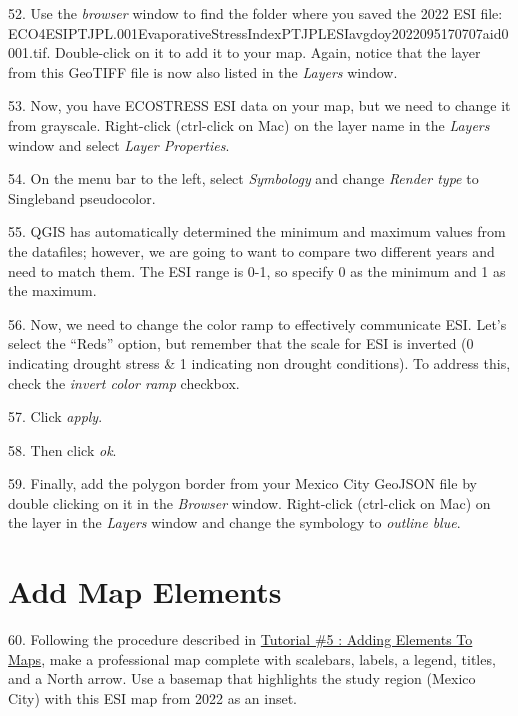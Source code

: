 \documentclass[oneside,a4paper,11pt,explicit]{book}
\begin{document}
52. Use the \textit{browser} window to find the folder where you saved the 2022 ESI file: \\ ECO4ESIPTJPL.001\textunderscore Evaporative\textunderscore Stress\textunderscore Index\textunderscore PT\textunderscore JPL\textunderscore ESIavg\textunderscore doy2022095170707\textunderscore aid0001.tif. Double-click on it to add it to your map. Again, notice that the layer from this GeoTIFF file is now also listed in the \textit{Layers} window.


53. Now, you have ECOSTRESS ESI data on your map, but we need to change it from grayscale. Right-click (ctrl-click on Mac) on the layer name in the \textit{Layers} window and select \textit{Layer Properties}. 

54. On the menu bar to the left, select \textit{Symbology} and change \textit{Render type} to Singleband pseudocolor. 

55. QGIS has automatically determined the minimum and maximum values from the datafiles; however, we are going to want to compare two different years and need to match them. The ESI range is 0-1, so specify 0 as the minimum and 1 as the maximum. 

56. Now, we need to change the color ramp to effectively communicate ESI. Let's select the ``Reds'' option, but remember that the scale for ESI is inverted (0 indicating drought stress \& 1 indicating non drought conditions). To address this, check the \textit{invert color ramp} checkbox. 

57. Click \textit{apply}.

58. Then click \textit{ok}.

59. Finally, add the polygon border from your Mexico City GeoJSON file by double clicking on it in the \textit{Browser} window. Right-click (ctrl-click on Mac) on the layer in the \textit{Layers} window and change the symbology to \textit{outline blue}. 

\section{Add Map Elements}

60. Following the procedure described in \href{https://jeremydforsythe.github.io/icecream-tutorials/Tutorial5_AddingElementsToMaps/Tutorial5_AddingElementsToMaps.pdf}{Tutorial \#5 : Adding Elements To Maps}, make a professional map complete with scalebars, labels, a legend, titles, and a North arrow. Use a basemap that highlights the study region (Mexico City) with this ESI map from 2022 as an inset. 
\end{document}
